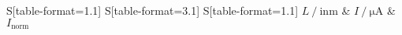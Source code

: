 \begin{table}
    \centering
    \caption{Resonatorlänge und dazu gemessene Intensität bei einem Resonator mit einem flachen und einem konkaven Spiegel}
    \label{tab:flat}
    \begin{tabular}{
	S[table-format=1.1]
	S[table-format=3.1]
	S[table-format=1.1]
	}
	\toprule
	{$L \ / \ \mathrm{in} \si{\metre}$}		& {$I \ / \ \si{\micro\ampere}$}		& 
	{$I_\text{norm}$}		\\ 
	\midrule
    
    \bottomrule
    \end{tabular}
    \end{table}
